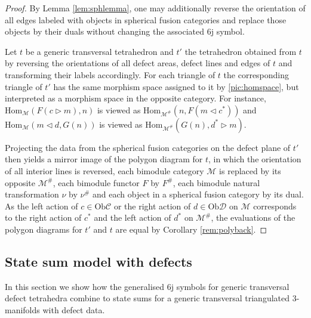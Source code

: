 \documentclass[1.5pt, a4paper]{article}
\newcommand{\mac}{\mathcal C}
\newcommand{\mad}{\mathcal D}
\newcommand{\mam}{\mathcal M}
\newcommand{\Hom}{\mathrm{Hom}}
\newcommand{\Ob}{\mathrm{Ob}}
\begin{document}
\begin{proof} 
By Lemma \ref{lem:sphlemma}, one may additionally reverse the orientation of all edges labeled with objects in spherical fusion categories and replace those objects by their duals without changing the associated 6j symbol. 

Let $t$ be a generic transversal tetrahedron and $t'$ the tetrahedron obtained  from $t$ by reversing the orientations of all defect areas,  defect lines and edges of $t$ 
 and transforming their labels accordingly.  For each triangle of $t$ the corresponding triangle of $t'$ has  the same morphism space assigned to it  by \eqref{pic:homspace}, but interpreted as a morphism space in the opposite category. For instance, $\Hom_\mam(F(c\rhd m), n)$ is viewed as $\Hom_{\mam^\#}(n, F(m\lhd c^*))$  and $\Hom_{\mam}(m\lhd d, G(n))$ is viewed as $\Hom_{\mam^\#}(G(n), d^*\rhd m)$. 

Projecting  the data from the spherical fusion categories on the defect plane of $t'$ then  yields a mirror image of the polygon diagram for $t$, in which the orientation of all interior lines is reversed, each bimodule category $\mam$ is replaced by its opposite $\mam^\#$, each bimodule functor $F$ by $F^\#$, each bimodule natural transformation $\nu$ by $\nu^\#$
and each object in a spherical fusion category by its dual. As the left action of $c\in \Ob\mac$ or the right action of $d\in \Ob\mad$ on $\mam$ corresponds to the right action of $c^*$ and the left action of $d^*$ on $\mam^\#$, the evaluations of the polygon diagrams for $t'$ and $t$ are equal by Corollary \ref{rem:polyback}.\end{proof}


\subsection{State sum model with defects}
In this section we show how the generalised 6j symbols for generic transversal defect tetrahedra  combine to state sums for a generic transversal triangulated 3-manifolds with defect data. 
\end{document}
